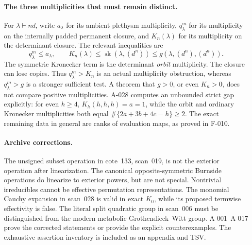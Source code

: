 \documentclass[11pt]{article}
\begin{document}
\paragraph{The three multiplicities that must remain distinct.}
For \(\lambda\vdash nd\), write \(a_\lambda\) for its ambient
plethysm multiplicity, \(q^m_\lambda\) for its multiplicity on the
internally padded permanent closure, and \(K_n(\lambda)\) for
its multiplicity on the determinant closure. The relevant inequalities
are
\[
 q^m_\lambda\leq a_\lambda,\qquad
 K_n(\lambda)\leq\operatorname{sk}(\lambda,(d^n))
                         \leq g(\lambda,(d^n),(d^n)).
\]
The symmetric Kronecker term is the determinant \emph{orbit}
multiplicity. The closure can lose copies. Thus \(q^m_\lambda>K_n\)
is an actual multiplicity obstruction, whereas \(q^m_\lambda>g\)
is a stronger sufficient test. A theorem that \(g>0\), or even
\(K_n>0\), does not compare positive multiplicities. A-028 computes an unbounded strict gap explicitly: for even \(h\geq4\),
\(K_h(h,h,h)=a=1\), while the orbit and ordinary Kronecker
multiplicities both equal \(\#\{2a+3b+4c=h\}\geq2\).
The exact remaining data in general are ranks of evaluation maps,
as proved in F-010.

\paragraph{Archive corrections.}
The unsigned subset operation in cote~133, scan~019, is not the
exterior operation after linearization. The canonical opposite-symmetric
Burnside operations do linearize to exterior powers, but are not
special. Nontrivial irreducibles cannot be effective permutation
representations. The monomial Cauchy expansion in scan~028 is valid
in exact \(K_0\), while its proposed termwise effectivity is false.
The literal split quadratic group in scan~006 must be distinguished
from the modern metabolic Grothendieck--Witt group. A-001--A-017
prove the corrected statements or provide the explicit counterexamples.
The exhaustive assertion inventory is included as an appendix and TSV.
\end{document}
